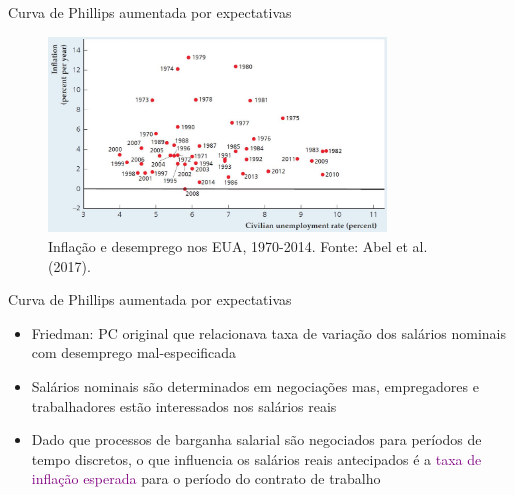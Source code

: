 \documentclass[10pt]{beamer}
\begin{document}
\begin{frame}{Curva de Phillips aumentada por expectativas}
    \begin{figure}
        \centering
        \includegraphics[width=0.8\textwidth]{./figures/aula10_fig10.JPG}
        \caption{Inflação e desemprego nos EUA, 1970-2014. Fonte: Abel et al. (2017).}
        \label{fig10}
    \end{figure}
\end{frame}

\begin{frame}{Curva de Phillips aumentada por expectativas}
    \begin{itemize}
        \item Friedman: PC original que relacionava taxa de variação dos salários nominais com desemprego mal-especificada
        \bigskip
        \item Salários nominais são determinados em negociações mas, empregadores e trabalhadores estão interessados nos salários reais
        \bigskip
        \item Dado que processos de barganha salarial são negociados para períodos de tempo discretos, o que influencia os salários reais antecipados é a \textcolor{purple}{taxa de inflação esperada} para o período do contrato de trabalho
    \end{itemize}    
\end{frame}
\end{document}
